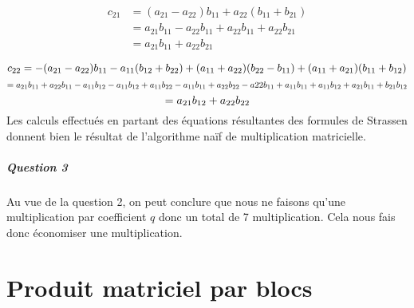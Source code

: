 \documentclass[a4paper,10pt,margin=2in]{report}
\begin{document}
\bigskip
\begin{align*}
c_{21} &= (a_{21} - a_{22})b_{11} + a_{22}(b_{11} + b_{21})\\
&= a_{21}b_{11} - a_{22}b_{11} + a_{22}b_{11} + a_{22}b_{21}\\
&= a_{21}b_{11} + a_{22}b_{21}
\end{align*}

\bigskip
\begin{equation*}
c_{22} = -(a_{21} - a_{22})b_{11} - a_{11}(b_{12} + b_{22}) + (a_{11} + a_{22})(b_{22} - b_{11}) + (a_{11} + a_{21})(b_{11} + b_{12})\\
\end{equation*}
\begin{equation*}
= a_{21}b_{11} + a_{22}b_{11} - a_{11}b_{12} - a_{11}b_{12} + a_{11}b_{22} - a_{11}b_{11} + a_{22}b_{22} - a{22}b_{11} + a_{11}b_{11} + a_{11}b_{12} + a_{21}b_{11} + b_{21}b_{12}\\
\end{equation*}
\begin{equation*}
= a_{21}b_{12} + a_{22}b_{22}\\
\end{equation*}
Les calculs effectués en partant des équations résultantes des formules de Strassen donnent bien le résultat de l'algorithme naïf de multiplication matricielle.

\paragraph{Question 3}
Au vue de la question 2, on peut conclure que nous ne faisons qu'une multiplication par coefficient $q$ donc un total de 7 multiplication. Cela nous fais donc économiser une multiplication. 

\chapter{Produit matriciel par blocs}
\end{document}
